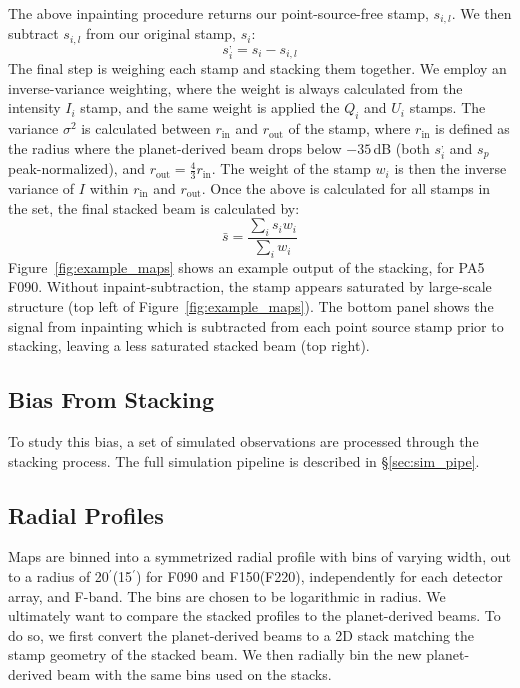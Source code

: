  The above inpainting procedure returns our point-source-free stamp, $s_{i,l}$.  We then subtract $s_{i,l}$ from our original stamp, $s_i$:
\begin{equation}
    s_i^{,} = s_i - s_{i,l}
\end{equation}
The final step is weighing each stamp and stacking them together.  We employ an inverse-variance weighting, where the weight is always calculated from the intensity $I_i$ stamp, and the same weight is applied the $Q_i$ and $U_i$ stamps.  The variance $\sigma^2$ is calculated between $r_{\text{in}}$ and $r_{\text{out}}$ of the stamp, where $r_{\text{in}}$ is defined as the radius where the planet-derived beam drops below $-35$\,dB (both $s_i^{,}$ and $s_p$ peak-normalized), and $r_{\text{out}}=\frac{4}{3}r_{\text{in}}$.  The weight of the stamp $w_i$ is then the inverse variance of $I$ within $r_{\text{in}}$ and $r_{\text{out}}$.  Once the above is calculated for all stamps in the set, the final stacked beam is calculated by:
\begin{equation}
    \bar{s} = \frac{\sum_i s_i w_i }{\sum_i w_i}
\end{equation}
Figure~\ref{fig:example_maps} shows an example output of the stacking, for PA5 F090.  Without inpaint-subtraction, the stamp appears saturated by large-scale structure (top left of Figure~\ref{fig:example_maps}).  The bottom panel shows the signal from inpainting which is subtracted from each point source stamp prior to stacking, leaving a less saturated stacked beam (top right).

\subsection{Bias From Stacking}
\label{subsec:bias}
To study this bias, a set of simulated observations are processed through the stacking process.  The full simulation pipeline is described in \S\ref{sec:sim_pipe}.

\subsection{Radial Profiles}
\label{subsec:profs}
Maps are binned into a symmetrized radial profile with bins of varying width, out to a radius of 20$^{\prime}$(15$^{\prime}$) for F090 and F150(F220), independently for each detector array, and F-band.  The bins are chosen to be logarithmic in radius.  We ultimately want to compare the stacked profiles to the planet-derived beams.  To do so, we first convert the planet-derived beams to a 2D stack matching the stamp geometry of the stacked beam.  We then radially bin the new planet-derived beam with the same bins used on the stacks.

